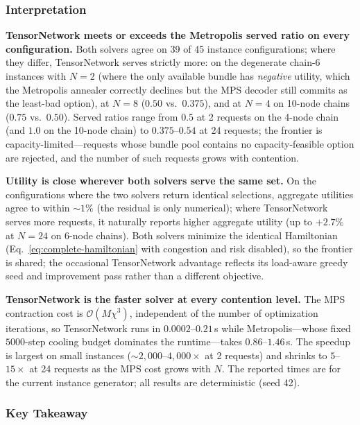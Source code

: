 \documentclass[10pt,a4paper]{article}
\begin{document}
\subsubsection{Interpretation}

\textbf{TensorNetwork meets or exceeds the Metropolis served ratio on
every configuration.}  Both solvers agree on 39 of 45 instance
configurations; where they differ, TensorNetwork serves strictly
more: on the degenerate chain-6 instances with $N{=}2$ (where the
only available bundle has \emph{negative} utility, which the Metropolis
annealer correctly declines but the MPS decoder still commits as the
least-bad option), at $N{=}8$ ($0.50$ vs.\ $0.375$), and at $N{=}4$ on
10-node chains ($0.75$ vs.\ $0.50$).  Served ratios range from $0.5$
at 2 requests on the 4-node chain (and $1.0$ on the 10-node chain) to
$0.375$--$0.54$ at 24 requests; the frontier is
capacity-limited---requests whose bundle pool contains no
capacity-feasible option are rejected, and the number of such requests
grows with contention.

\textbf{Utility is close wherever both solvers serve the same set.}
On the configurations where the two solvers return identical
selections, aggregate utilities agree to within $\sim\!1\%$ (the
residual is only numerical); where TensorNetwork serves more
requests, it naturally reports higher aggregate utility (up to
$+2.7\%$ at $N{=}24$ on 6-node chains).  Both solvers minimize the
identical Hamiltonian (Eq.~\eqref{eq:complete-hamiltonian} with
congestion and risk disabled), so the frontier is shared; the
occasional TensorNetwork advantage reflects its load-aware greedy
seed and improvement pass rather than a different objective.

\textbf{TensorNetwork is the faster solver at every contention level.}
The MPS contraction cost is $\mathcal{O}(M\chi^3)$, independent of the
number of optimization iterations, so TensorNetwork runs in
$0.0002$--$0.21$\,s while Metropolis---whose fixed $5000$-step cooling
budget dominates the runtime---takes $0.86$--$1.46$\,s.  The speedup is
largest on small instances ($\sim\!2{,}000$--$4{,}000\times$ at 2
requests) and shrinks to $5$--$15\times$ at 24 requests as the MPS
cost grows with $N$.  The reported times are for the current instance
generator; all results are deterministic (seed 42).

\subsubsection{Key Takeaway}
\end{document}
